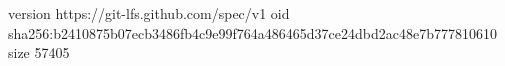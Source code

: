 version https://git-lfs.github.com/spec/v1
oid sha256:b2410875b07ecb3486fb4c9e99f764a486465d37ce24dbd2ac48e7b777810610
size 57405
